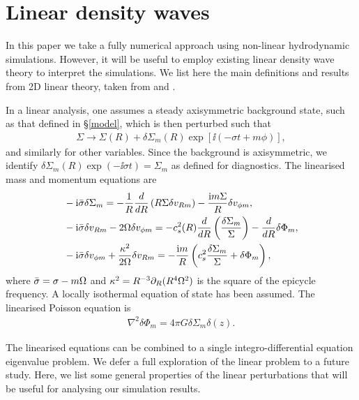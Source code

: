 \section{Linear density waves}\label{wkb}
In this paper we take a fully numerical approach using non-linear
hydrodynamic simulations. However, it will be useful to employ
existing linear density wave theory to interpret the simulations.
We list here the main definitions and results from 2D linear theory,
taken from \cite{lin11} and \cite{shu91}.  

In a linear analysis, one assumes a steady axisymmetric background state, such as
that defined in \S\ref{model}, which is then perturbed such that
\begin{align}  
  \Sigma \to \Sigma(R) + \delta\Sigma_m(R)\exp{\left[\ii\left(-\sigma t +
        m\phi\right)\right]}, 
\end{align}
and similarly for other variables. Since the background is
axisymmetric, we identify $\delta\Sigma_m(R)\exp{\left(-\ii\sigma
    t\right)} = \Sigma_m$ as defined for diagnostics. 
The linearised mass and momentum equations are
\begin{align}
  &-\mathrm{i}\bar{\sigma} \delta\Sigma_m = -\frac{1}{R}\frac{d}{dR}\left(R\Sigma\delta
    v_{Rm}\right) - \frac{\mathrm{i} m \Sigma}{R}\delta v_{\phi m}, \\
  &-\mathrm{i}\bar{\sigma}\delta v_{Rm} - 2\Omega \delta v_{\phi m} = -
  c_s^2(R)\frac{d}{dR}\left(\frac{\delta\Sigma_m}{\Sigma}\right) - \frac{d}{dR}\delta\Phi_m,\\
  & -\mathrm{i}\bar{\sigma}\delta v_{\phi m} + \frac{\kappa^2}{2\Omega}\delta v_{Rm} =
  -\frac{\mathrm{i} m }{R}\left(c_s^2\frac{\delta\Sigma_m}{\Sigma} + \delta\Phi_m\right),
\end{align}
where $\bar{\sigma} = \sigma - m\Omega$ and $\kappa^2 =
R^{-3}\partial_R(R^4\Omega^2)$ is the square of the epicycle frequency. A
locally isothermal equation of state has been assumed.    
The linearised Poisson equation is 
\begin{align}
  \nabla^2\delta\Phi_m = 4\pi G \delta\Sigma_m \delta(z). 
\end{align}

The linearised equations can be combined to a single
integro-differential equation eigenvalue problem. We defer a full
exploration of the linear problem to a future study. Here, we list some
general  properties of the linear perturbations that will be useful
for analysing our simulation results. 


